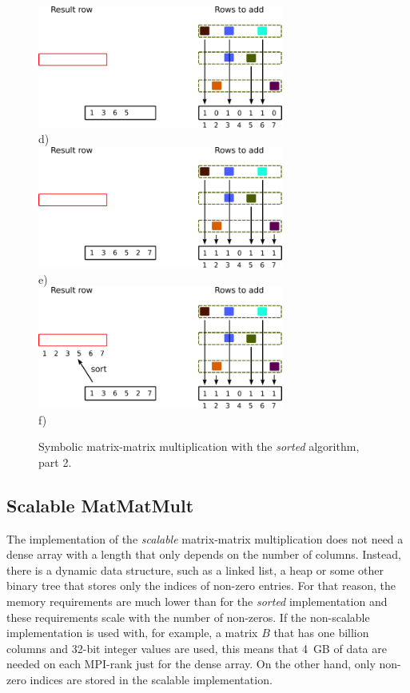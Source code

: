 \begin{figure}[H]
\centering
\includegraphics[width=0.72\textwidth]{sorted/spgemm-sorted-7}\\
d)\\
\vspace*{5mm}
\includegraphics[width=0.72\textwidth]{sorted/spgemm-sorted-9}\\
e)\\
\vspace*{5mm}
\includegraphics[width=0.72\textwidth]{sorted/spgemm-sorted-10}\\
f)\\
\vspace*{5mm}
\caption{Symbolic matrix-matrix multiplication with the \textit{sorted} algorithm, part 2.}
\label{fig:spgemm-sorted_2}
\end{figure}


\subsection{Scalable MatMatMult}
The implementation of the \textit{scalable} matrix-matrix multiplication does not need a dense array with a length that only depends on the number of columns. Instead, there is a dynamic data structure, such as a linked list, a heap or some other binary tree that stores only the indices of non-zero entries. For that reason, the memory requirements are much lower than for the \textit{sorted} implementation and these requirements scale with the number of non-zeros. If the non-scalable implementation is used with, for example, a matrix $B$ that has one billion columns and 32-bit integer values are used, this means that 4~GB of data are needed on each MPI-rank just for the dense array. On the other hand, only non-zero indices are stored in the scalable implementation.

